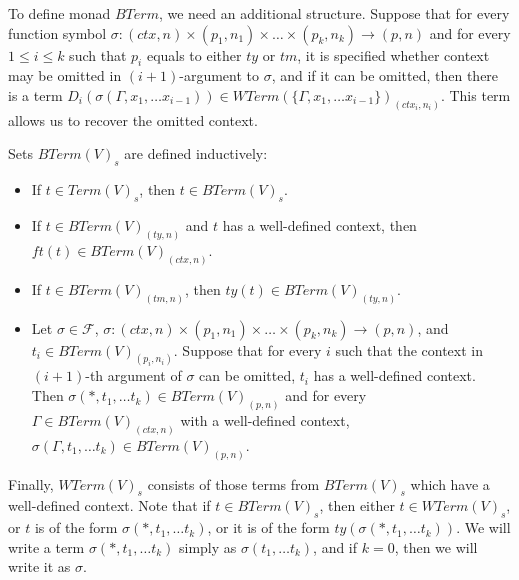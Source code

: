 \documentclass[reqno]{amsart}
\theoremstyle{definition}
\theoremstyle{remark}
\numberwithin{figure}{section}
\begin{document}
To define monad $BTerm$, we need an additional structure.
Suppose that for every function symbol $\sigma : (ctx,n) \times (p_1,n_1) \times \ldots \times (p_k,n_k) \to (p,n)$
    and for every $1 \leq i \leq k$ such that $p_i$ equals to either $ty$ or $tm$, it is specified whether context may be omitted in $(i+1)$-argument to $\sigma$,
    and if it can be omitted, then there is a term $D_i(\sigma(\Gamma, x_1, \ldots x_{i-1})) \in WTerm(\{ \Gamma, x_1, \ldots x_{i-1} \})_{(ctx_i,n_i)}$.
This term allows us to recover the omitted context.

Sets $BTerm(V)_s$ are defined inductively:
\begin{itemize}
\item If $t \in Term(V)_s$, then $t \in BTerm(V)_s$.
\item If $t \in BTerm(V)_{(ty,n)}$ and $t$ has a well-defined context, then $ft(t) \in BTerm(V)_{(ctx,n)}$.
\item If $t \in BTerm(V)_{(tm,n)}$, then $ty(t) \in BTerm(V)_{(ty,n)}$.
\item Let $\sigma \in \mathcal{F}$, $\sigma : (ctx,n) \times (p_1,n_1) \times \ldots \times (p_k,n_k) \to (p,n)$, and $t_i \in BTerm(V)_{(p_i,n_i)}$.
    Suppose that for every $i$ such that the context in $(i+1)$-th argument of $\sigma$ can be omitted, $t_i$ has a well-defined context.
    Then $\sigma(*, t_1, \ldots t_k) \in BTerm(V)_{(p,n)}$ and for every $\Gamma \in BTerm(V)_{(ctx,n)}$
        with a well-defined context, $\sigma(\Gamma, t_1, \ldots t_k) \in BTerm(V)_{(p,n)}$.
\end{itemize}

Finally, $WTerm(V)_s$ consists of those terms from $BTerm(V)_s$ which have a well-defined context.
Note that if $t \in BTerm(V)_s$, then either $t \in WTerm(V)_s$, or $t$ is of the form $\sigma(*, t_1, \ldots t_k)$, or it is of the form $ty(\sigma(*, t_1, \ldots t_k))$.
We will write a term $\sigma(*, t_1, \ldots t_k)$ simply as $\sigma(t_1, \ldots t_k)$, and if $k = 0$, then we will write it as $\sigma$.
\end{document}
